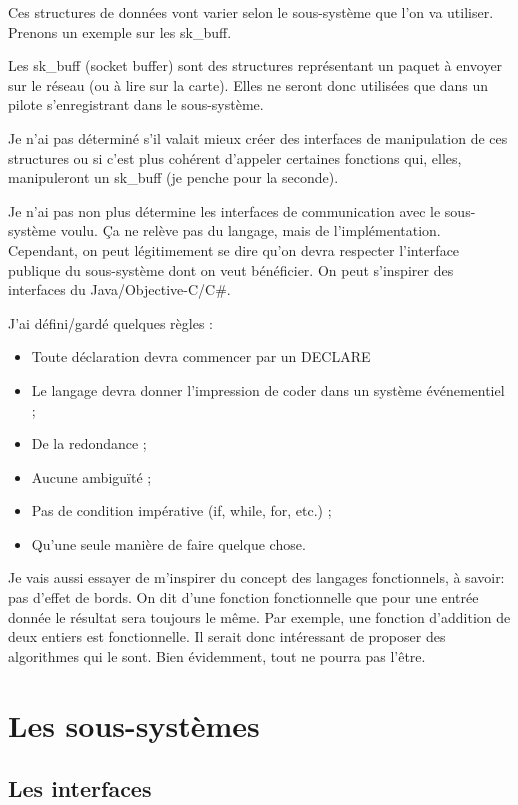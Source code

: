 \documentclass{rtxreport}
\begin{document}
Ces structures de données vont varier selon le sous-système que l’on va utiliser. Prenons un exemple sur les sk\_buff.

Les sk\_buff (socket buffer) sont des structures représentant un paquet à envoyer sur le réseau (ou à lire sur la carte). Elles ne seront donc utilisées que dans un pilote s’enregistrant dans le sous-système.

Je n’ai pas déterminé s’il valait mieux créer des interfaces de manipulation de ces structures ou si c’est plus cohérent d’appeler certaines fonctions qui, elles, manipuleront un sk\_buff (je penche pour la seconde).

Je n’ai pas non plus détermine les interfaces de communication avec le sous-système voulu. Ça ne relève pas du langage, mais de l’implémentation. Cependant, on peut légitimement se dire qu’on devra respecter l’interface publique du sous-système dont on veut bénéficier. On peut s’inspirer des interfaces du Java/Objective-C/C\#.


J’ai défini/gardé quelques règles : 
\begin{itemize}
	\item Toute déclaration devra commencer par un DECLARE 
	\item Le langage devra donner l’impression de coder dans un système événementiel ; 
	\item De la redondance ; 
	\item Aucune ambiguïté ;
	\item Pas de condition impérative (if, while, for, etc.) ; 
	\item Qu’une seule manière de faire quelque chose.
\end{itemize}

Je vais aussi essayer de m’inspirer du concept des langages fonctionnels, à savoir: pas d’effet de bords. On dit d’une fonction fonctionnelle que pour une entrée donnée le résultat sera toujours le même. Par exemple, une fonction d’addition de deux entiers est fonctionnelle. Il serait donc intéressant de proposer des algorithmes qui le sont. Bien évidemment, tout ne pourra pas l’être.

\chapter{Les sous-systèmes}

\section{Les interfaces}
\end{document}
